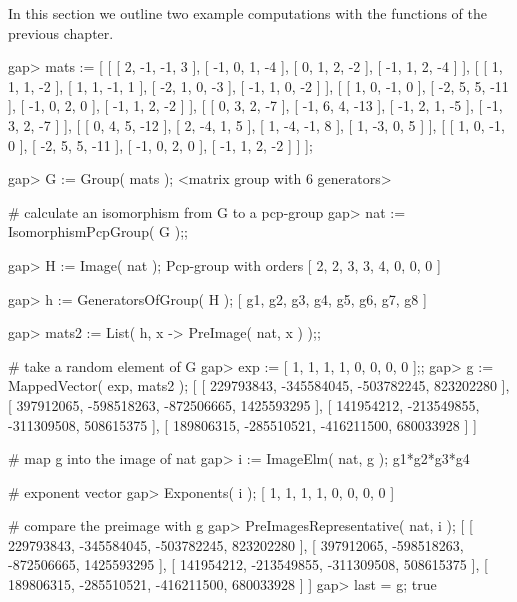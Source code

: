 
In this section we outline two example computations with the functions
of the previous chapter. 


\beginexample
gap> mats := 
[ [ [ 2, -1, -1, 3 ], [ -1, 0, 1, -4 ], [ 0, 1, 2, -2 ], [ -1, 1, 2, -4 ] ],
  [ [ 1, 1, 1, -2 ], [ 1, 1, -1, 1 ], [ -2, 1, 0, -3 ], [ -1, 1, 0, -2 ] ],
  [ [ 1, 0, -1, 0 ], [ -2, 5, 5, -11 ], [ -1, 0, 2, 0 ], [ -1, 1, 2, -2 ] ],
  [ [ 0, 3, 2, -7 ], [ -1, 6, 4, -13 ], [ -1, 2, 1, -5 ], [ -1, 3, 2, -7 ] ],
  [ [ 0, 4, 5, -12 ], [ 2, -4, 1, 5 ], [ 1, -4, -1, 8 ], [ 1, -3, 0, 5 ] ],
  [ [ 1, 0, -1, 0 ], [ -2, 5, 5, -11 ], [ -1, 0, 2, 0 ], [ -1, 1, 2, -2 ] ] ];

gap> G := Group( mats );
<matrix group with 6 generators>

# calculate an isomorphism from G to a pcp-group
gap> nat := IsomorphismPcpGroup( G );;   
     
gap> H := Image( nat );
Pcp-group with orders [ 2, 2, 3, 3, 4, 0, 0, 0 ]

gap> h := GeneratorsOfGroup( H );
[ g1, g2, g3, g4, g5, g6, g7, g8 ]

gap> mats2 := List( h, x -> PreImage( nat, x ) );;

# take a random element of G
gap> exp :=  [ 1, 1, 1, 1, 0, 0, 0, 0 ];;
gap> g := MappedVector( exp, mats2 );
[ [ 229793843, -345584045, -503782245, 823202280 ],
  [ 397912065, -598518263, -872506665, 1425593295 ],
  [ 141954212, -213549855, -311309508, 508615375 ],
  [ 189806315, -285510521, -416211500, 680033928 ] ]

# map g into the image of nat
gap> i := ImageElm( nat, g );
g1*g2*g3*g4

# exponent vector 
gap> Exponents( i );
[ 1, 1, 1, 1, 0, 0, 0, 0 ]

# compare the preimage with g
gap> PreImagesRepresentative( nat, i );
[ [ 229793843, -345584045, -503782245, 823202280 ],
  [ 397912065, -598518263, -872506665, 1425593295 ],
  [ 141954212, -213549855, -311309508, 508615375 ],
  [ 189806315, -285510521, -416211500, 680033928 ] ]
gap> last = g;
true

